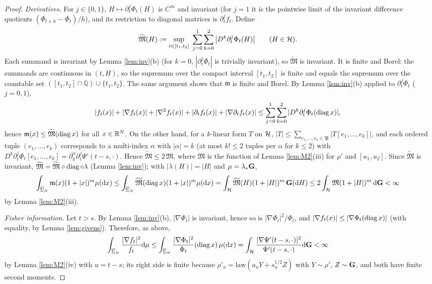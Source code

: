 \begin{proof}
\emph{Derivatives.} For $j\in\{0,1\}$, $H\mapsto\partial_t^j\Phi_t(H)$ is $C^\infty$ and invariant (for $j=1$ it is the pointwise limit of the invariant difference quotients $(\Phi_{t+h}-\Phi_t)/h$), and its restriction to diagonal matrices is $\partial_t^jf_t$. Define
\[\widetilde{\mathfrak M}(H):=\sup_{t\in[t_1,t_2]}\ \sum_{j=0}^1\sum_{k=0}^2\big|D^k\partial_t^j\Phi_t(H)\big|\qquad(H\in\cH).\]
Each summand is invariant by Lemma \ref{lem:inv}(b) (for $k=0$, $|\partial_t^j\Phi_t|$ is trivially invariant), so $\widetilde{\mathfrak M}$ is invariant.
It is finite and Borel: the summands are continuous in $(t,H)$, so the supremum over the compact interval $[t_1,t_2]$ is finite and equals the supremum over the countable set $([t_1,t_2]\cap\mathbb Q)\cup\{t_1,t_2\}$. The same argument shows that $\mathfrak m$ is finite and Borel.
By Lemma \ref{lem:inv}(b) applied to $\partial_t^j\Phi_t$ ($j=0,1$),
\[|f_t(x)|+|\nabla f_t(x)|+|\nabla^2f_t(x)|+|\partial_tf_t(x)|+|\nabla\partial_tf_t(x)|\le\sum_{j=0}^1\sum_{k=0}^2|D^k\partial_t^j\Phi_t(\operatorname{diag} x)|,\]
hence $\mathfrak m(x)\le\widetilde{\mathfrak M}(\operatorname{diag} x)$ for all $x\in\mathbb{R}^N$.
On the other hand, for a $k$-linear form $T$ on $\mathcal{H}$, $|T|\le\sum_{e_1,\dots,e_k\in\mathfrak B}|T[e_1,\dots,e_k]|$, and each ordered tuple $(e_1,\dots,e_k)$ corresponds to a multi-index $\alpha$ with $|\alpha|=k$ (at most $k!\le2$ tuples per $\alpha$ for $k\le2$) with $D^k\partial_t^j\Phi_t[e_1,\dots,e_k]=\partial_y^\alpha\partial_t^j\Psi'(t-s,\cdot)$. Hence $\widetilde{\mathfrak M}\le2\,\mathfrak M$, where $\mathfrak M$ is the function of Lemma \ref{lem:M2}(iii) for $\rho'$ and $[u_1,u_2]$.
Since $\widetilde{\mathfrak M}$ is invariant, $\widetilde{\mathfrak M}=\widetilde{\mathfrak M}\circ\operatorname{diag}\circ\lambda$ (Lemma \ref{lem:inv}); with $|\lambda(H)|=|H|$ and $\mu=\lambda_*\mathbf{G}$,
\[\int_{\overline{\Sigma}_N}\mathfrak m(x)(1+|x|)^m\mu(\mathrm{d} x)\le\int_{\overline{\Sigma}_N}\widetilde{\mathfrak M}(\operatorname{diag} x)(1+|x|)^m\mu(\mathrm{d} x)=\int_{\mathcal{H}}\widetilde{\mathfrak M}(H)(1+|H|)^m\,\mathbf{G}(\mathrm{d} H)\le2\int_{\mathcal{H}}\mathfrak M(1+|H|)^m\,\mathrm{d}\mathbf{G}<\infty\]
by Lemma \ref{lem:M2}(iii).

\emph{Fisher information.} Let $t>s$. By Lemma \ref{lem:inv}(b), $|\nabla\Phi_t|$ is invariant, hence so is $|\nabla\Phi_t|^2/\Phi_t$, and $|\nabla f_t(x)|\le|\nabla\Phi_t(\operatorname{diag} x)|$ (with equality, by Lemma \ref{lem:givens}). Therefore, as above,
\[\int_{\overline{\Sigma}_N}\frac{|\nabla f_t|^2}{f_t}\mathrm{d}\mu\le\int_{\overline{\Sigma}_N}\frac{|\nabla\Phi_t|^2}{\Phi_t}(\operatorname{diag} x)\,\mu(\mathrm{d} x)=\int_{\mathcal{H}}\frac{|\nabla\Psi'(t-s,\cdot)|^2}{\Psi'(t-s,\cdot)}\mathrm{d}\mathbf{G}<\infty\]
by Lemma \ref{lem:M2}(iv) with $u=t-s$; its right side is finite because $\rho'_{u}=\mathrm{law}(a_uY+s_u^{1/2}Z)$ with $Y\sim\rho'$, $Z\sim\mathbf{G}$, and both have finite second moments.
\end{proof}

